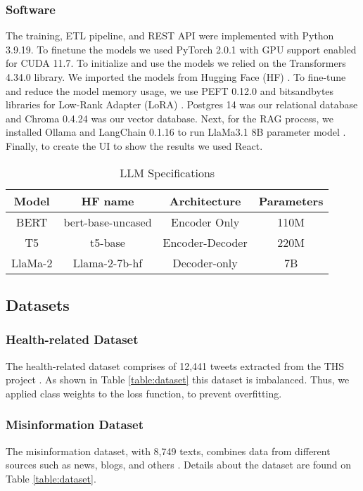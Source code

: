 \subsubsection{Software}
The training, ETL pipeline, and REST API were implemented with Python 3.9.19. To finetune the models we used PyTorch 2.0.1 with GPU support enabled for
CUDA 11.7. To initialize and use the models we relied on  the Transformers 4.34.0 library. We imported the models from Hugging Face (HF) \cite{huggingface}. To fine-tune and reduce the model memory usage, we use PEFT 0.12.0 and bitsandbytes libraries for Low-Rank Adapter (LoRA) \cite{hu2021loralowrankadaptationlarge}. Postgres 14 was our relational database and Chroma 0.4.24 was our vector database. Next, for the RAG process, we installed Ollama \cite{ollama} and LangChain 0.1.16 to run LlaMa3.1 8B parameter model \cite{touvron2023llamaopenefficientfoundation}. Finally, to create the UI to show the results we used React.

  \begin{table}[htbp]
\centering
\caption{LLM Specifications}
{\scriptsize
\begin{tabular}{||c | c | c | c||} 
 \hline
\textbf{Model} & \textbf{HF name} & \textbf{Architecture} & \textbf{Parameters} \\
 \hline
 BERT & bert-base-uncased & Encoder Only & 110M \\ 
 \hline
 T5 & t5-base & Encoder-Decoder & 220M \\
 \hline
 LlaMa-2 & Llama-2-7b-hf & Decoder-only & 7B \\
 \hline
\end{tabular}
}
\label{table:LLM}
\end{table}

\subsection{Datasets}

\subsubsection{Health-related Dataset}
The health-related dataset comprises of 12,441 tweets extracted from the THS project \cite{8622504}. As shown in Table \ref{table:dataset} this dataset is imbalanced. Thus, we applied class weights to the loss function, to prevent overfitting.

\subsubsection{Misinformation Dataset}
The misinformation dataset, with 8,749 texts, combines data from different sources such as news, blogs, and others \cite{stephencrone2022,coviddata,covidunesco}. %
Details about the dataset are found on Table \ref{table:dataset}.

